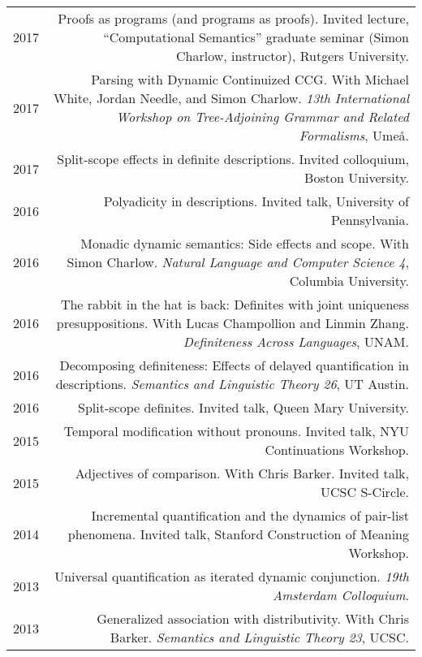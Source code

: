 \documentclass[12pt]{article}
\begin{document}
\begin{longtable}{LR}
  2017 & Proofs as programs (and programs as proofs).
         Invited lecture, ``Computational Semantics''
         graduate seminar (Simon Charlow, instructor), Rutgers University.\\
  2017 & Parsing with Dynamic Continuized CCG.
         With Michael White, Jordan Needle, and Simon Charlow.
         \textit{13th International Workshop on Tree-Adjoining Grammar and
         Related Formalisms}, Ume\aa.\\
  2017 & Split-scope effects in definite descriptions.
         Invited colloquium, Boston University.\\
  2016 & Polyadicity in descriptions.
         Invited talk, University of Pennsylvania.\\
  2016 & Monadic dynamic semantics: Side effects and scope.
         With Simon Charlow.
         \textit{Natural Language and Computer Science 4}, Columbia University.\\
  2016 & The rabbit in the hat is back: Definites with joint uniqueness
         presuppositions.
         With Lucas Champollion and Linmin Zhang.
         \textit{Definiteness Across Languages}, UNAM.\\
  2016 & Decomposing definiteness: Effects of delayed quantification in
         descriptions.
         \textit{Semantics and Linguistic Theory 26}, UT Austin.\\
  2016 & Split-scope definites.
         Invited talk, Queen Mary University.\\
  2015 & Temporal modification without pronouns.
         Invited talk, NYU Continuations Workshop.\\
  2015 & Adjectives of comparison.
         With Chris Barker.
         Invited talk, UCSC S-Circle.\\
  2014 & Incremental quantification and the dynamics of pair-list phenomena.
         Invited talk, Stanford Construction of Meaning Workshop.\\
  2013 & Universal quantification as iterated dynamic conjunction.
         \textit{19th Amsterdam Colloquium}. \\
  2013 & Generalized association with distributivity.
         With Chris Barker.
         \textit{Semantics and Linguistic Theory 23}, UCSC.\\

\end{longtable}
\end{document}
